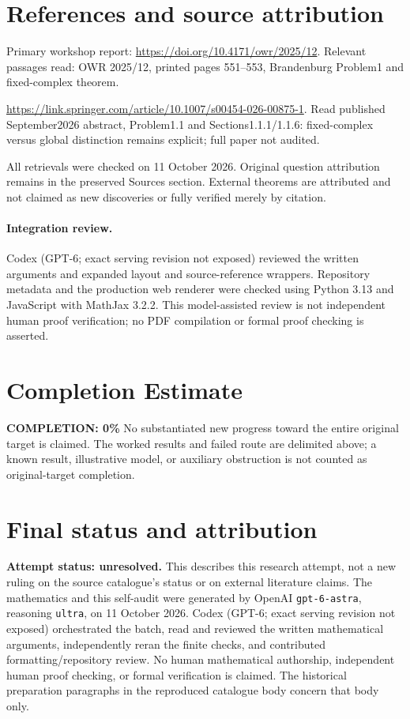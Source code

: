 \documentclass[11pt]{article}
\begin{document}
\section{References and source attribution}
Primary workshop report: \url{https://doi.org/10.4171/owr/2025/12}. Relevant passages read: OWR 2025/12, printed pages 551--553, Brandenburg Problem1 and fixed-complex theorem.

\url{https://link.springer.com/article/10.1007/s00454-026-00875-1}. Read published September2026 abstract, Problem1.1 and Sections1.1.1/1.1.6: fixed-complex versus global distinction remains explicit; full paper not audited.

All retrievals were checked on 11 October 2026. Original question attribution remains in the preserved Sources section. External theorems are attributed and not claimed as new discoveries or fully verified merely by citation.


\paragraph{Integration review.} Codex (GPT-6; exact serving revision not exposed) reviewed the written arguments and expanded layout and source-reference wrappers. Repository metadata and the production web renderer were checked using Python 3.13 and JavaScript with MathJax 3.2.2. This model-assisted review is not independent human proof verification; no PDF compilation or formal proof checking is asserted.

\section{Completion Estimate}
\noindent\textbf{COMPLETION: 0\%}
No substantiated new progress toward the entire original target is claimed. The worked results and failed route are delimited above; a known result, illustrative model, or auxiliary obstruction is not counted as original-target completion.

\section{Final status and attribution}
\textbf{Attempt status: unresolved.} This describes this research attempt, not a new ruling on the source catalogue's status or on external literature claims.
The mathematics and this self-audit were generated by OpenAI \texttt{gpt-6-astra}, reasoning \texttt{ultra}, on 11 October 2026. Codex (GPT-6; exact serving revision not exposed) orchestrated the batch, read and reviewed the written mathematical arguments, independently reran the finite checks, and contributed formatting/repository review. No human mathematical authorship, independent human proof checking, or formal verification is claimed. The historical preparation paragraphs in the reproduced catalogue body concern that body only.
\end{document}
